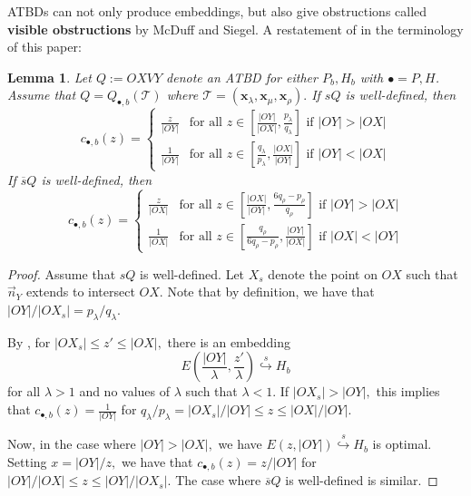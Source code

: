 \documentclass[11pt, reqno]{amsart}
\newtheorem{lemma}[thm]{Lemma}
\theoremstyle{remark}
\numberwithin{equation}{subsection}
\numberwithin{figure}{section}
\theoremstyle{customremark}
\newcommand{\Tt}{\mathcal{T}}
\newcommand{\vn}{{\vec{n}}}
\newcommand{\ov}{\overline}
\newcommand{\la}{{\lambda}}
\newcommand{\sembeds}{\stackrel{s}{\hookrightarrow}}
\begin{document}
ATBDs can not only produce embeddings, but also give obstructions called {\bf visible obstructions} by McDuff and Siegel. A restatement of \cite[Corollary 6.1.4]{McSi} in the terminology of this paper:  
\begin{lemma}\cite[Corollary 6.1.4]{McSi} \label{lem:visObs}
Let $Q:=OXVY$ denote an ATBD for either $P_b,H_b$ with $\bullet=P,H$. Assume that $Q=Q_{\bullet, b}(\Tt)$ where $\Tt=(\bm{x}_\la,\bm{x}_\mu,\bm{x}_\rho).$ If $sQ$ is well-defined, then \[c_{\bullet,b}(z)=\begin{cases}
    \frac{z}{|OY|} & \text{for all $z \in \left[\frac{|OY|}{|OX|},\frac{p_\la}{q_\la}\right]$ if $|OY|>|OX|$} \\
    \frac{1}{|OY|} & \text{for all $z \in \left[\frac{q_\la}{p_\la},\frac{|OX|}{|OY|}\right]$ if $|OY|<|OX|$}
\end{cases}\]
If $\ov{s}Q$ is well-defined, then \[c_{\bullet,b}(z)=\begin{cases}
    \frac{z}{|OX|} & \text{for all $z \in \left[\frac{|OX|}{|OY|},\frac{6q_\rho-p_\rho}{q_\rho}\right]$ if $|OY|>|OX|$} \\
    \frac{1}{|OX|} & \text{for all $z \in \left[\frac{q_\rho}{6q_\rho-p_\rho},\frac{|OY|}{|OX|}\right]$ if $|OX|<|OY|$}
\end{cases}\]


\end{lemma}
\begin{proof}
    Assume that $sQ$ is well-defined. Let $X_s$ denote the point on $OX$ such that $\vn_Y$ extends to intersect $OX.$ Note that by definition, we have that $|OY|/|OX_s|=p_\la/q_\la.$ 

    
    By \cite[Corollary 6.1.4]{McSi}, for $|OX_s| \leq z' \leq |OX|,$ there is an embedding \[E\left(\frac{|OY|}{\la},\frac{z'}{\la}\right) \sembeds H_b\] for all $\la>1$ and no values of $\la$ such that $\la<1$. If $|OX_s|>|OY|,$ this implies that $c_{\bullet,b}(z)=\frac{1}{|OY|}$ for  $q_\la/p_\la=|OX_s|/|OY| \leq z \leq |OX|/|OY|$. 
  

    Now, in the case where $|OY|>|OX|,$ we have $E(z,|OY|) \sembeds H_b$ is optimal. Setting $x=|OY|/z,$ we have that $c_{\bullet,b}(z)=z/|OY|$ for $|OY|/|OX| \leq z \leq |OY|/|OX_s|.$ The case where $\ov{s}Q$ is well-defined is similar. 
\end{proof}
\end{document}
